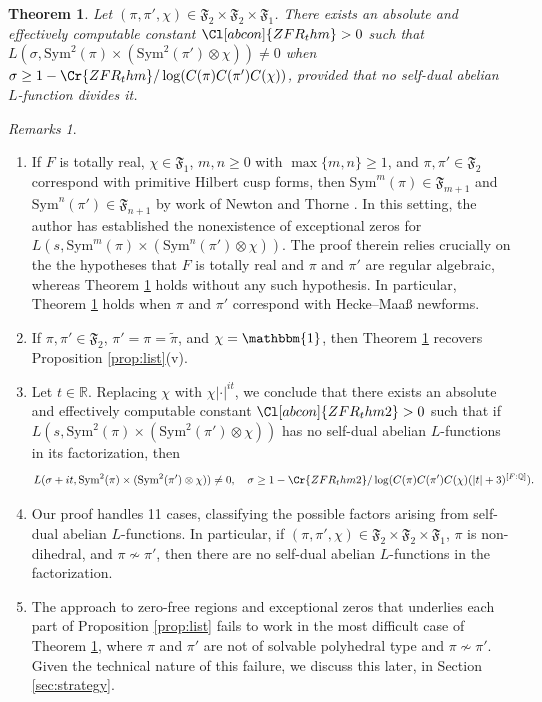 \documentclass[11pt]{amsart}
\newtheorem{theorem}{Theorem}[section]
\theoremstyle{remark}
\newtheorem*{remarks}{Remarks}
\numberwithin{equation}{section}
\begin{document}
\begin{theorem}
\label{thm}
Let $(\pi,\pi',\chi)\in\mathfrak{F}_{2}\times\mathfrak{F}_{2}\times\mathfrak{F}_{1}$.  There exists an absolute and effectively computable constant $\Cl[abcon]{ZFR_thm}>0$ such that $L(\sigma,\mathrm{Sym}^2(\pi)\times(\mathrm{Sym}^2(\pi')\otimes\chi))\neq 0$ when $\sigma\geq 1-\Cr{ZFR_thm}/\log(C(\pi)C(\pi')C(\chi))$, provided that no self-dual abelian $L$-function divides it.
\end{theorem}

\begin{remarks}
\begin{enumerate}
\item If $F$ is totally real, $\chi\in\mathfrak{F}_1$, $m,n\geq 0$ with $\max\{m,n\}\geq 1$, and $\pi,\pi'\in\mathfrak{F}_2$ correspond with primitive Hilbert cusp forms, then $\mathrm{Sym}^m(\pi)\in\mathfrak{F}_{m+1}$ and $\mathrm{Sym}^n(\pi')\in\mathfrak{F}_{n+1}$ by work of Newton and Thorne \cite{NewtonThorne3}.  In this setting, the author \cite{Thorner_Siegel} has established the nonexistence of exceptional zeros for $L(s,\mathrm{Sym}^m(\pi)\times(\mathrm{Sym}^n(\pi')\otimes\chi))$.  The proof therein relies crucially on the the hypotheses that $F$ is totally real and $\pi$ and $\pi'$ are regular algebraic, whereas Theorem \ref{thm} holds without any such hypothesis.  In particular, Theorem \ref{thm} holds when $\pi$ and $\pi'$ correspond with Hecke--Maa{\ss} newforms.
	\item If $\pi,\pi'\in\mathfrak{F}_2$, $\pi'=\pi=\widetilde{\pi}$, and $\chi=\mathbbm{1}$, then Theorem \ref{thm} recovers Proposition \ref{prop:list}(v).
	\item Let $t\in\mathbb{R}$.  Replacing $\chi$ with $\chi|\cdot|^{it}$, we conclude that there exists an absolute and effectively computable constant $\Cl[abcon]{ZFR_thm2}>0$ such that if $L(s,\mathrm{Sym}^2(\pi)\times(\mathrm{Sym}^2(\pi')\otimes\chi))$ has no self-dual abelian $L$-functions in its factorization, then
\[
L(\sigma+it,\mathrm{Sym}^2(\pi)\times(\mathrm{Sym}^2(\pi')\otimes\chi))\neq 0,\quad \sigma\geq 1-\Cr{ZFR_thm2}/\log(C(\pi)C(\pi')C(\chi)(|t|+3)^{[F:\mathbb{Q}]}).
\]
\item Our proof handles 11 cases, classifying the possible factors arising from self-dual abelian $L$-functions.  In particular, if $(\pi,\pi',\chi)\in\mathfrak{F}_{2}\times\mathfrak{F}_{2}\times\mathfrak{F}_{1}$, $\pi$ is non-dihedral, and $\pi\not\sim\pi'$, then there are no self-dual abelian $L$-functions in the factorization.
\item The approach to zero-free regions and exceptional zeros that underlies each part of Proposition \ref{prop:list}	fails to work in the most difficult case of Theorem \ref{thm}, where $\pi$ and $\pi'$ are not of solvable polyhedral type and $\pi\not\sim\pi'$.  Given the technical nature of this failure, we discuss this later, in Section \ref{sec:strategy}.
\end{enumerate}
\end{remarks}
\end{document}
